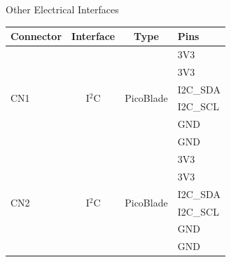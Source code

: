 \begin{frame}{Other Electrical Interfaces}

    \begin{table}[!htb]\tiny
        \centering
        \label{tab:icd}
        \begin{tabular}{lccl}
            \toprule[1.5pt]
            \textbf{Connector} & \textbf{Interface} & \textbf{Type} & \textbf{Pins} \\
            \midrule
            \multirow{6}{*}{CN1} & \multirow{6}{*}{I$^{2}$C} & \multirow{6}{*}{PicoBlade} & 3V3 \\
                                 &                           &                            & 3V3 \\
                                 &                           &                            & I2C\_SDA \\
                                 &                           &                            & I2C\_SCL \\
                                 &                           &                            & GND \\
                                 &                           &                            & GND \\
            \midrule
            \multirow{6}{*}{CN2} & \multirow{6}{*}{I$^{2}$C} & \multirow{6}{*}{PicoBlade} & 3V3 \\
                                 &                           &                            & 3V3 \\
                                 &                           &                            & I2C\_SDA \\
                                 &                           &                            & I2C\_SCL \\
                                 &                           &                            & GND \\
                                 &                           &                            & GND \\
            \bottomrule[1.5pt]
        \end{tabular}
    \end{table}

\end{frame}

